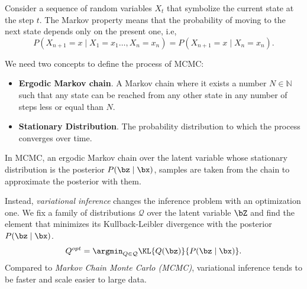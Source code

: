 \begin{center}
\end{center}

Consider a sequence of random variables \(X_{t}\) that symbolize the current state at the step \(t\). The Markov property means that the probability of moving to the next state depends only on the present one, i.e,
\[
  P(X_{n+1} = x \mid X_{1} = x_{1} \dots, X_{n} = x_{n}) = P(X_{n+1} = x \mid X_{n} = x_{n}).
\]

We need two concepts to define the process of MCMC:
\begin{itemize}
  \item \textbf{Ergodic Markov chain}. A Markov chain where it exists a number \(N \in \mathbb{N}\) such that any state can be reached from any other state in any number of steps less or equal than \(N\).
  \item \textbf{Stationary Distribution}. The probability distribution to which the process converges over time.
\end{itemize}

In MCMC, an ergodic Markov chain over the latent variable whose stationary distribution is the posterior \(P(\bz \mid \bx)\), samples are taken from the chain to approximate the posterior with them.

Instead, \emph{variational inference} changes the inference problem with an optimization one. We fix a family of distributions \(\mathcal{Q}\) over the latent variable \(\bZ\) and find the element that minimizes its Kullback-Leibler divergence with the posterior \(P(\bz \mid \bx)\).
\[
  Q^{opt} = \argmin_{Q \in \mathcal{Q}} \KL{Q(\bz)}{P(\bz \mid \bx)}.
\]
Compared to \emph{Markov Chain Monte Carlo (MCMC)}, variational inference tends to be faster and scale easier to large data.

